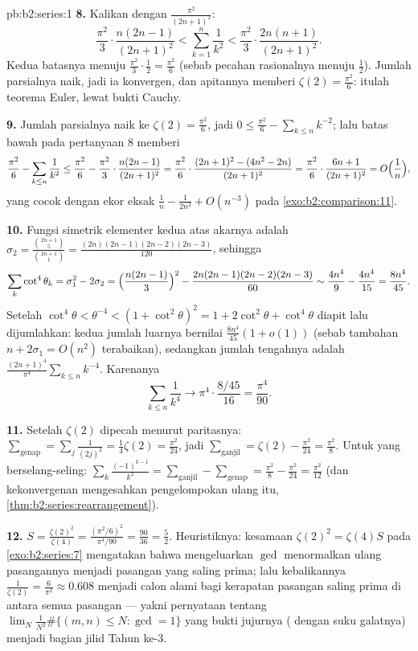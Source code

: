 \begin{solution}{pb:b2:series:1}
\textbf{8.} Kalikan dengan $\frac{\pi^2}{(2n+1)^2}$:
\[
\frac{\pi^2}{3}\cdot\frac{n(2n-1)}{(2n+1)^2}
< \sum_{k=1}^{n}\frac1{k^2} <
\frac{\pi^2}{3}\cdot\frac{2n(n+1)}{(2n+1)^2}.
\]
Kedua batasnya menuju $\frac{\pi^2}3\cdot\frac12 = \frac{\pi^2}6$
(sebab pecahan rasionalnya menuju $\frac12$). Jumlah parsialnya
naik, jadi ia konvergen, dan apitannya memberi $\zeta(2) =
\frac{\pi^2}6$: itulah teorema Euler, lewat bukti Cauchy.

\textbf{9.} Jumlah parsialnya naik ke $\zeta(2) = \frac{\pi^2}6$, jadi
$0 \leq \frac{\pi^2}6 - \sum_{k\leq n}k^{-2}$;
lalu batas bawah pada pertanyaan 8 memberi
\[
\frac{\pi^2}6 - \sum_{k\leq n}\frac1{k^2}
\leq \frac{\pi^2}6 - \frac{\pi^2}3\cdot\frac{n(2n-1)}{(2n+1)^2}
= \frac{\pi^2}6\cdot\frac{(2n+1)^2 - (4n^2 -
2n)}{(2n+1)^2}
= \frac{\pi^2}6\cdot\frac{6n + 1}{(2n+1)^2}
= O\Bigl(\frac1n\Bigr),
\]
yang cocok dengan ekor eksak $\frac1n - \frac1{2n^2} + O(n^{-3})$ pada
\cref{exo:b2:comparison:11}.

\textbf{10.} Fungsi simetrik elementer kedua atas akarnya adalah
$\sigma_2 = \frac{\binom{2n+1}5}{\binom{2n+1}1} =
\frac{(2n)(2n-1)(2n-2)(2n-3)}{120}$, sehingga
\[
\sum_k\cot^4\theta_k = \sigma_1^2 - 2\sigma_2
= \Bigl(\frac{n(2n-1)}3\Bigr)^2 -
\frac{2n(2n-1)(2n-2)(2n-3)}{60}
\sim \frac{4n^4}9 - \frac{4n^4}{15} = \frac{8n^4}{45}.
\]
Setelah $\cot^4\theta < \theta^{-4} < (1 + \cot^2\theta)^2 =
1 + 2\cot^2\theta + \cot^4\theta$ diapit lalu dijumlahkan: kedua jumlah
luarnya bernilai $\frac{8n^4}{45}(1 + o(1))$ (sebab tambahan $n +
2\sigma_1 = O(n^2)$ terabaikan), sedangkan jumlah tengahnya adalah
$\frac{(2n+1)^4}{\pi^4}\sum_{k\leq n}k^{-4}$. Karenanya
\[
\sum_{k\leq n}\frac1{k^4} \longrightarrow
\pi^4\cdot\frac{8/45}{16} = \frac{\pi^4}{90}.
\]

\textbf{11.} Setelah $\zeta(2)$ dipecah menurut paritasnya:
$\sum_{\text{genap}} = \sum_j\frac{1}{(2j)^2} = \frac14\zeta(2) =
\frac{\pi^2}{24}$, jadi $\sum_{\text{ganjil}} = \zeta(2) -
\frac{\pi^2}{24} = \frac{\pi^2}8$. Untuk yang berselang-seling:
$\sum_k\frac{(-1)^{k-1}}{k^2} = \sum_{\text{ganjil}} -
\sum_{\text{genap}} = \frac{\pi^2}8 - \frac{\pi^2}{24} =
\frac{\pi^2}{12}$ (dan kekonvergenan  mengesahkan
pengelompokan ulang itu, \cref{thm:b2:series:rearrangement}).

\textbf{12.} $S = \frac{\zeta(2)^2}{\zeta(4)} =
\frac{(\pi^2/6)^2}{\pi^4/90} = \frac{90}{36} = \frac52$.
Heuristiknya: kesamaan $\zeta(2)^2 = \zeta(4)S$ pada
\cref{exo:b2:series:7} mengatakan bahwa mengeluarkan $\gcd$
menormalkan ulang pasangannya menjadi pasangan yang saling prima;
lalu kebalikannya $\frac1{\zeta(2)} = \frac6{\pi^2} \approx 0.608$
menjadi calon alami bagi kerapatan pasangan saling prima di antara
semua pasangan --- yakni pernyataan tentang $\lim_N
\frac{1}{N^2}\#\{(m,n) \leq N : \gcd = 1\}$ yang bukti jujurnya
( dengan suku galatnya) menjadi bagian jilid Tahun ke-3.


\end{solution}
